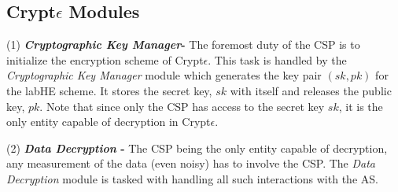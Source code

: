 \subsection{Crypt$\epsilon$ Modules}


(1)\textbf{\textit{ Cryptographic Key Manager}-} The foremost duty of the \textsf{CSP} is to initialize the encryption scheme of Crypt$\epsilon$. This task is handled by the \textit{Cryptographic Key Manager} module which generates the key pair $(sk,pk)$ for the \textsf{labHE} scheme. It stores the secret key, $sk$ with itself and releases the public key, $pk$. Note that since only the \textsf{CSP} has access to the secret key $sk$, it is the only entity capable of decryption in Crypt$\epsilon$.

(2)\textbf{\textit{ Data Decryption} - } The \textsf{CSP} being the only entity capable of decryption,  any measurement of the data (even noisy) has to involve the \textsf{CSP}. The \textit{Data Decryption} module is tasked with handling all such interactions with the \textsf{AS}. 

